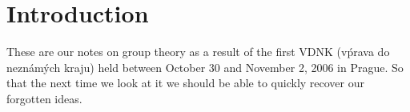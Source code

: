 \chapter{Introduction}

These are our notes on group theory as a result of the first VDNK (v\'prava do
nezn\'am\'ych kraju) held between October 30 and November 2, 2006 in Prague.
So that the next time we look at it we should be able to quickly recover our
forgotten ideas. 
